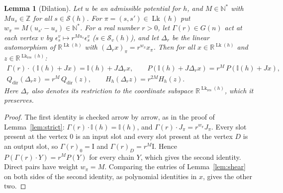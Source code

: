 \documentclass[11pt,a4paper]{article}
\newtheorem{lemma}[theorem]{Lemma}
\theoremstyle{definition}
\theoremstyle{remark}
\numberwithin{equation}{section}
\newcommand{\N}{\mathbb{N}}
\newcommand{\Z}{\mathbb{Z}}
\newcommand{\R}{\mathbb{R}}
\newcommand{\id}{\mathrm{I}}
\newcommand{\I}{\mathbb I}
\newcommand{\Sl}{\mathcal S}
\newcommand{\Lk}{\operatorname{Lk}}
\begin{document}
\begin{lemma}[Dilation]\label{lem:dilation}
Let $u$ be an admissible potential for $h$, and $M\in\N^*$ with $Mu_s\in\Z$ for all $s\in\Sl(h)$. For $\pi=(s,s')\in\Lk(h)$ put $w_\pi=M(u_{s'}-u_s)\in\N^*$. For a real number $r>0$, let $\Gamma(r)\in G(n)$ act at each vertex $v$ by $\epsilon^v_s\mapsto r^{Mu_s}\epsilon^v_s$ ($s\in\Sl_v(h)$), and let $\Delta_r$ be the linear automorphism of $\R^{\Lk(h)}$ with $(\Delta_rx)_\pi=r^{w_\pi}x_\pi$. Then for all $x\in\R^{\Lk(h)}$ and $z\in\R^{\Lk_{\mathrm{res}}(h)}$:
\begin{gather*}
\Gamma(r)\cdot(\I(h)+Jx)=\I(h)+J\Delta_rx,\qquad P(\I(h)+J\Delta_rx)=r^M\,P(\I(h)+Jx),\\
Q_{\mathrm{dir}}(\Delta_rz)=r^M\,Q_{\mathrm{dir}}(z),\qquad H_h(\Delta_rz)=r^{2M}H_h(z).
\end{gather*}
Here $\Delta_r$ also denotes its restriction to the coordinate subspace $\R^{\Lk_{\mathrm{res}}(h)}$, which it preserves.
\end{lemma}
\begin{proof}
The first identity is checked arrow by arrow, as in the proof of Lemma~\ref{lem:strict}: $\Gamma(r)\cdot\I(h)=\I(h)$, and $\Gamma(r)\cdot J_\pi=r^{w_\pi}J_\pi$. Every slot present at the vertex $0$ is an input slot and every slot present at the vertex $D$ is an output slot, so $\Gamma(r)_0=\id$ and $\Gamma(r)_D=r^M\id$. Hence $P(\Gamma(r)\cdot Y)=r^MP(Y)$ for every chain $Y$, which gives the second identity. Direct pairs have weight $w_\pi=M$. Comparing the entries of Lemma~\ref{lem:shear} on both sides of the second identity, as polynomial identities in $x$, gives the other two.
\end{proof}
\end{document}
